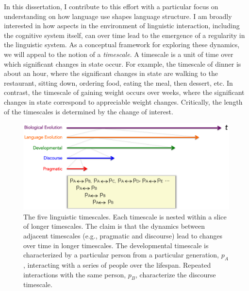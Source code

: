 In this dissertation, I contribute to this effort with a particular focus on understanding on how language use shapes language structure. I am broadly interested in how  aspects in the environment of linguistic interaction, including the cognitive system itself, can over time lead to the emergence of a regularity in the linguistic system. As a conceptual framework for exploring these dynamics, we will appeal to the notion of a {\it timescale}. A timescale is a unit of time over which significant changes in state occur. For example, the timescale of dinner is about an hour, where the significant changes in state are walking to the restaurant, sitting down, ordering food, eating the meal, then dessert, etc. In contrast, the timescale of gaining weight occurs over weeks, where the significant changes in state correspond to appreciable weight changes. Critically, the length of the timescales is determined by the change of interest. 


\begin{figure}
\begin{center} 
\includegraphics[width=6in]{figs/timescales1}
\caption{The five linguistic timescales. Each timescale is nested within a slice of longer timescales. The claim is that the dynamics between adjacent timescales (e.g., pragmatic and discourse) lead to changes over time in longer timescales. The developmental timescale is characterized by a particular person from a particular generation, $p_A$, interacting with a series of people over the lifespan. Repeated interactions with the same person, $p_B$, characterize the discourse timescale.}
\label{fig:timescales}
\end{center} 
\end{figure}


